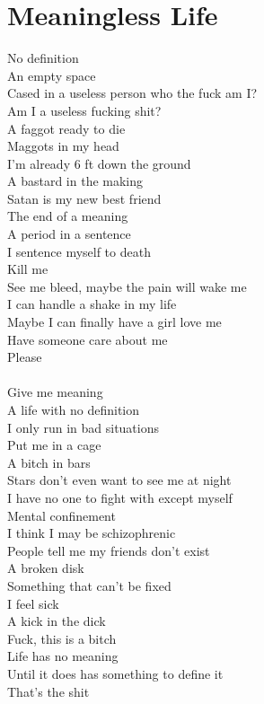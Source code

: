 \documentclass[12pt, b5paper]{article}
\begin{document}
\section{Meaningless Life}
No definition 
\\An empty space
\\Cased in a useless person who the fuck am I? 
\\Am I a useless fucking shit? 
\\A faggot ready to die 
\\Maggots in my head 
\\I’m already 6 ft down the ground 
\\A bastard in the making 
\\Satan is my new best friend 
\\The end of a meaning 
\\A period in a sentence 
\\I sentence myself to death 
\\Kill me 
\\See me bleed, maybe the pain will wake me 
\\I can handle a shake in my life 
\\Maybe I can finally have a girl love me 
\\Have someone care about me 
\\Please 
%
\\\\Give me meaning 
\\A life with no definition 
\\I only run in bad situations
\\Put me in a cage 
\\A bitch in bars 
\\Stars don’t even want to see me at night 
\\I have no one to fight with except myself 
\\Mental confinement 
\\I think I may be schizophrenic
\\People tell me my friends don’t exist
\\A broken disk 
\\Something that can’t be fixed 
\\I feel sick
\\A kick in the dick
\\Fuck, this is a bitch 
\\Life has no meaning
\\Until it does has something to define it 
\\That’s the shit
\end{document}
